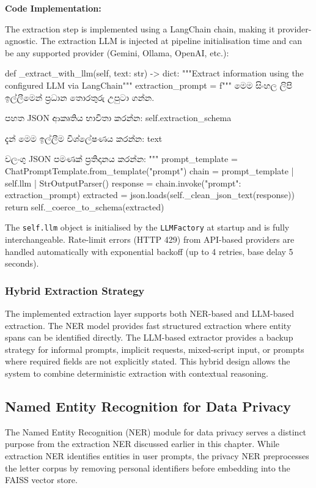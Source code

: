 \documentclass[12pt]{uomthesis}
\begin{document}
\textbf{Code Implementation:}

The extraction step is implemented using a LangChain chain, making it provider-agnostic. The extraction LLM is injected at pipeline initialisation time and can be any supported provider (Gemini, Ollama, OpenAI, etc.):

\begin{SinhalaVerbatim}
def _extract_with_llm(self, text: str) -> dict:
    """Extract information using the configured LLM via LangChain"""
    extraction_prompt = f"""
    මෙම සිංහල ලිපි ඉල්ලීමෙන් ප්‍රධාන තොරතුරු උපුටා ගන්න.

    පහත JSON ආකෘතිය භාවිතා කරන්න:
    {self.extraction_schema}

    දැන් මෙම ඉල්ලීම විශ්ලේෂණය කරන්න:
    {text}

    වලංගු JSON පමණක් ප්‍රතිදානය කරන්න:
    """
    prompt_template = ChatPromptTemplate.from_template("{prompt}")
    chain = prompt_template | self.llm | StrOutputParser()
    response = chain.invoke({"prompt": extraction_prompt})
    extracted = json.loads(self._clean_json_text(response))
    return self._coerce_to_schema(extracted)
\end{SinhalaVerbatim}

The \texttt{self.llm} object is initialised by the \texttt{LLMFactory} at startup and is fully interchangeable. Rate-limit errors (HTTP 429) from API-based providers are handled automatically with exponential backoff (up to 4 retries, base delay 5 seconds).

\subsubsection{Hybrid Extraction Strategy}

The implemented extraction layer supports both NER-based and LLM-based extraction. The NER model provides fast structured extraction where entity spans can be identified directly. The LLM-based extractor provides a backup strategy for informal prompts, implicit requests, mixed-script input, or prompts where required fields are not explicitly stated. This hybrid design allows the system to combine deterministic extraction with contextual reasoning.

\subsection{Named Entity Recognition for Data Privacy}

The Named Entity Recognition (NER) module for data privacy serves a distinct purpose from the extraction NER discussed earlier in this chapter. While extraction NER identifies entities in user prompts, the privacy NER preprocesses the letter corpus by removing personal identifiers before embedding into the FAISS vector store.
\end{document}
